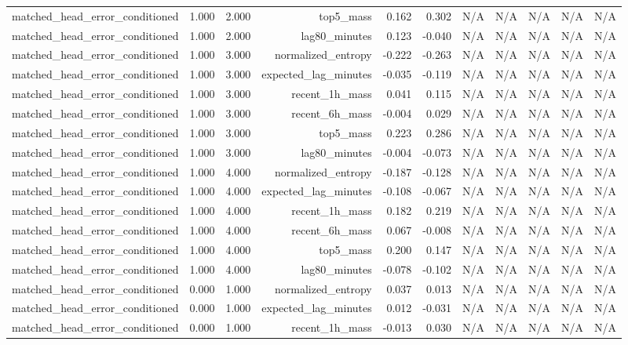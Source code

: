 \begin{table}[h!]
\begin{tabular}{lrrrrrrrrrr}
matched\_head\_error\_conditioned & 1.000 & 2.000 & top5\_mass & 0.162 & 0.302 & N/A & N/A & N/A & N/A & N/A \\
matched\_head\_error\_conditioned & 1.000 & 2.000 & lag80\_minutes & 0.123 & -0.040 & N/A & N/A & N/A & N/A & N/A \\
matched\_head\_error\_conditioned & 1.000 & 3.000 & normalized\_entropy & -0.222 & -0.263 & N/A & N/A & N/A & N/A & N/A \\
matched\_head\_error\_conditioned & 1.000 & 3.000 & expected\_lag\_minutes & -0.035 & -0.119 & N/A & N/A & N/A & N/A & N/A \\
matched\_head\_error\_conditioned & 1.000 & 3.000 & recent\_1h\_mass & 0.041 & 0.115 & N/A & N/A & N/A & N/A & N/A \\
matched\_head\_error\_conditioned & 1.000 & 3.000 & recent\_6h\_mass & -0.004 & 0.029 & N/A & N/A & N/A & N/A & N/A \\
matched\_head\_error\_conditioned & 1.000 & 3.000 & top5\_mass & 0.223 & 0.286 & N/A & N/A & N/A & N/A & N/A \\
matched\_head\_error\_conditioned & 1.000 & 3.000 & lag80\_minutes & -0.004 & -0.073 & N/A & N/A & N/A & N/A & N/A \\
matched\_head\_error\_conditioned & 1.000 & 4.000 & normalized\_entropy & -0.187 & -0.128 & N/A & N/A & N/A & N/A & N/A \\
matched\_head\_error\_conditioned & 1.000 & 4.000 & expected\_lag\_minutes & -0.108 & -0.067 & N/A & N/A & N/A & N/A & N/A \\
matched\_head\_error\_conditioned & 1.000 & 4.000 & recent\_1h\_mass & 0.182 & 0.219 & N/A & N/A & N/A & N/A & N/A \\
matched\_head\_error\_conditioned & 1.000 & 4.000 & recent\_6h\_mass & 0.067 & -0.008 & N/A & N/A & N/A & N/A & N/A \\
matched\_head\_error\_conditioned & 1.000 & 4.000 & top5\_mass & 0.200 & 0.147 & N/A & N/A & N/A & N/A & N/A \\
matched\_head\_error\_conditioned & 1.000 & 4.000 & lag80\_minutes & -0.078 & -0.102 & N/A & N/A & N/A & N/A & N/A \\
matched\_head\_error\_conditioned & 0.000 & 1.000 & normalized\_entropy & 0.037 & 0.013 & N/A & N/A & N/A & N/A & N/A \\
matched\_head\_error\_conditioned & 0.000 & 1.000 & expected\_lag\_minutes & 0.012 & -0.031 & N/A & N/A & N/A & N/A & N/A \\
matched\_head\_error\_conditioned & 0.000 & 1.000 & recent\_1h\_mass & -0.013 & 0.030 & N/A & N/A & N/A & N/A & N/A \\

\end{tabular}
\end{table}

